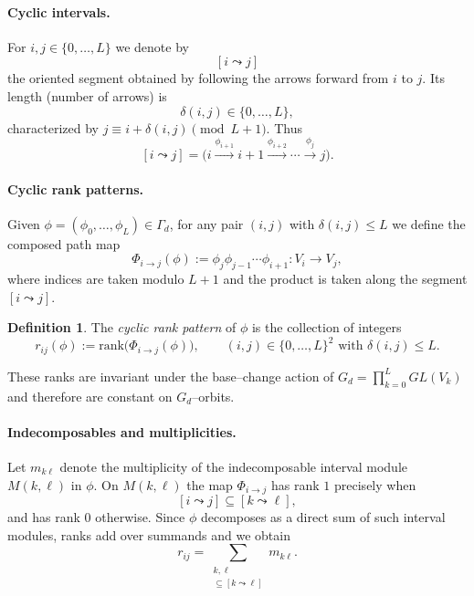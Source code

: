 \documentclass{article}
\theoremstyle{definition}
\newtheorem{definition}[theorem]{Definition}
\begin{document}
\paragraph{Cyclic intervals.}
For $i,j\in\{0,\dots,L\}$ we denote by
\[
[i\leadsto j]
\]
the oriented segment obtained by following the arrows forward from $i$
to $j$. Its length (number of arrows) is
\[
\delta(i,j)\in\{0,\dots,L\},
\]
characterized by $j \equiv i+\delta(i,j)\pmod{L+1}$. Thus
\[
[i\leadsto j]
=
\bigl(
i \xrightarrow{\phi_{i+1}} i+1 \xrightarrow{\phi_{i+2}} \cdots
\xrightarrow{\phi_{j}} j
\bigr).
\]

\paragraph{Cyclic rank patterns.}
Given $\phi=(\phi_0,\dots,\phi_L)\in\Gamma_d$, for any pair $(i,j)$
with $\delta(i,j)\le L$ we define the composed path map
\[
\Phi_{i\to j}(\phi)
:=
\phi_j\phi_{j-1}\cdots\phi_{i+1}
:
V_i\longrightarrow V_j,
\]
where indices are taken modulo $L+1$ and the product is taken along the
segment $[i\leadsto j]$.

\begin{definition}
The \emph{cyclic rank pattern} of $\phi$ is the collection of integers
\[
r_{ij}(\phi)
:=
\mathrm{rank}\bigl(\Phi_{i\to j}(\phi)\bigr),
\qquad
(i,j)\in\{0,\dots,L\}^2
\text{ with }\delta(i,j)\le L .
\]
\end{definition}

\noindent
These ranks are invariant under the base–change action of
$G_d=\prod_{k=0}^L GL(V_k)$ and therefore are constant on $G_d$–orbits.

\paragraph{Indecomposables and multiplicities.}
Let $m_{k\ell}$ denote the multiplicity of the indecomposable
interval module $M(k,\ell)$ in $\phi$.
On $M(k,\ell)$ the map $\Phi_{i\to j}$ has rank $1$ precisely when
\[
[i\leadsto j]\subseteq [k\leadsto \ell],
\]
and has rank $0$ otherwise. Since $\phi$ decomposes as a direct sum of
such interval modules, ranks add over summands and we obtain
\begin{equation}\label{eq:cyclic-rank-forward}
r_{ij}
=
\sum_{\substack{k,\ell\\
[i\leadsto j]\subseteq [k\leadsto \ell]}}
m_{k\ell}.
\end{equation}
\end{document}
